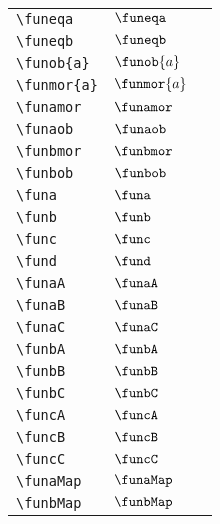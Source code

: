 \begin{longtable}{lll}
 {\color[rgb]{0.5,0.5,0.5}\texttt{\textbackslash funeqa}} & $\funeqa$ & \\ 
 {\color[rgb]{0.5,0.5,0.5}\texttt{\textbackslash funeqb}} & $\funeqb$ & \\ 
 {\color[rgb]{0.5,0.5,0.5}\texttt{\textbackslash funob\{a\}}} & $\funob{a}$ & \\ 
 {\color[rgb]{0.5,0.5,0.5}\texttt{\textbackslash funmor\{a\}}} & $\funmor{a}$ & \\ 
 {\color[rgb]{0.5,0.5,0.5}\texttt{\textbackslash funamor}} & $\funamor$ & \\ 
 {\color[rgb]{0.5,0.5,0.5}\texttt{\textbackslash funaob}} & $\funaob$ & \\ 
 {\color[rgb]{0.5,0.5,0.5}\texttt{\textbackslash funbmor}} & $\funbmor$ & \\ 
 {\color[rgb]{0.5,0.5,0.5}\texttt{\textbackslash funbob}} & $\funbob$ & \\ 
 {\color[rgb]{0.5,0.5,0.5}\texttt{\textbackslash funa}} & $\funa$ & \\ 
 {\color[rgb]{0.5,0.5,0.5}\texttt{\textbackslash funb}} & $\funb$ & \\ 
 {\color[rgb]{0.5,0.5,0.5}\texttt{\textbackslash func}} & $\func$ & \\ 
 {\color[rgb]{0.5,0.5,0.5}\texttt{\textbackslash fund}} & $\fund$ & \\ 
 {\color[rgb]{0.5,0.5,0.5}\texttt{\textbackslash funaA}} & $\funaA$ & \\ 
 {\color[rgb]{0.5,0.5,0.5}\texttt{\textbackslash funaB}} & $\funaB$ & \\ 
 {\color[rgb]{0.5,0.5,0.5}\texttt{\textbackslash funaC}} & $\funaC$ & \\ 
 {\color[rgb]{0.5,0.5,0.5}\texttt{\textbackslash funbA}} & $\funbA$ & \\ 
 {\color[rgb]{0.5,0.5,0.5}\texttt{\textbackslash funbB}} & $\funbB$ & \\ 
 {\color[rgb]{0.5,0.5,0.5}\texttt{\textbackslash funbC}} & $\funbC$ & \\ 
 {\color[rgb]{0.5,0.5,0.5}\texttt{\textbackslash funcA}} & $\funcA$ & \\ 
 {\color[rgb]{0.5,0.5,0.5}\texttt{\textbackslash funcB}} & $\funcB$ & \\ 
 {\color[rgb]{0.5,0.5,0.5}\texttt{\textbackslash funcC}} & $\funcC$ & \\ 
 {\color[rgb]{0.5,0.5,0.5}\texttt{\textbackslash funaMap}} & $\funaMap$ & \\ 
 {\color[rgb]{0.5,0.5,0.5}\texttt{\textbackslash funbMap}} & $\funbMap$ & \\ 

\end{longtable}
